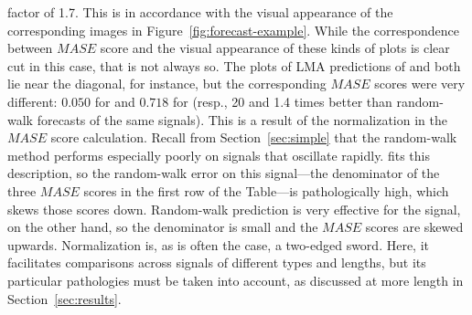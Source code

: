 factor of 1.7.  This is in accordance with the visual appearance of
the corresponding images in Figure~\ref{fig:forecast-example}.  While
the correspondence between $MASE$ score and the visual appearance of
these kinds of plots is clear cut in this case, that is not always so.
The plots of LMA predictions of \col and \svdfive both lie near the
diagonal, for instance, but the corresponding $MASE$ scores were very
different: $0.050$ for \col and $0.718$ for \svdfive (resp., 20 and
1.4 times better than random-walk forecasts of the same signals).
This is a result of the normalization in the $MASE$ score calculation.
Recall from Section~\ref{sec:simple} that the random-walk method
performs especially poorly on signals that oscillate rapidly.  \col
fits this description, so the random-walk error on this signal---the
denominator of the three $MASE$ scores in the first row of the
Table---is pathologically high, which skews those scores down.
Random-walk prediction is very effective for the \svdfive signal, on
the other hand, so the denominator is small and the $MASE$ scores are
skewed upwards.  Normalization is, as is often the case, a two-edged
sword.  Here, it facilitates comparisons across signals of different
types and lengths, but its particular pathologies must be taken into
account, as discussed at more length in Section~\ref{sec:results}.




